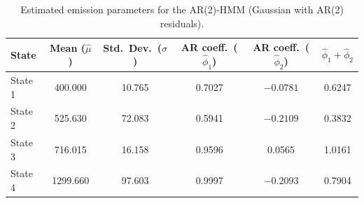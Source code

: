 \begin{table}[ht]
\centering
\begin{tabular}{lccccc}
\hline
State & Mean ($\hat{\mu}$) & Std.\ Dev.\ ($\hat{\sigma}$) & AR coeff.\ ($\hat{\phi}_1$) & AR coeff.\ ($\hat{\phi}_2$) & $\hat{\phi}_1 + \hat{\phi}_2$ \\
\hline
State 1 & 400.000 & 10.765 & 0.7027 & $-0.0781$ & 0.6247 \\
State 2 & 525.630 & 72.083 & 0.5941 & $-0.2109$ & 0.3832 \\
State 3 & 716.015 & 16.158 & 0.9596 & 0.0565 & 1.0161 \\
State 4 & 1299.660 & 97.603 & 0.9997 & $-0.2093$ & 0.7904 \\
\hline
\end{tabular}
\caption{Estimated emission parameters for the AR(2)-HMM (Gaussian with AR(2) residuals).}
\label{tab:ar_2_hmm_emissions}
\end{table}
